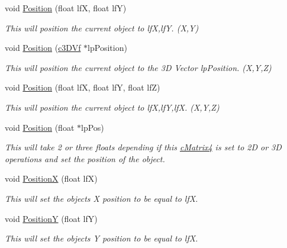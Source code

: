 \begin{DoxyCompactItemize}
void \hyperlink{classc_matrix4_a81cd364d37dc5eae6f968551331ad7a3}{Position} (float lfX, float lfY)
\begin{DoxyCompactList}\small\item\em This will position the current object to lfX,lfY. (X,Y) \item\end{DoxyCompactList}\item 
void \hyperlink{classc_matrix4_a8a49976693c27e4fbb5fce427eb6bcf5}{Position} (\hyperlink{classc3_d_vf}{c3DVf} $\ast$lpPosition)
\begin{DoxyCompactList}\small\item\em This will position the current object to the 3D Vector lpPosition. (X,Y,Z) \item\end{DoxyCompactList}\item 
void \hyperlink{classc_matrix4_ae404d9b94cb676d9896385fef1eda422}{Position} (float lfX, float lfY, float lfZ)
\begin{DoxyCompactList}\small\item\em This will position the current object to lfX,lfY,lfX. (X,Y,Z) \item\end{DoxyCompactList}\item 
void \hyperlink{classc_matrix4_ae3bb670db30cee45d59aef1599289086}{Position} (float $\ast$lpPos)
\begin{DoxyCompactList}\small\item\em This will take 2 or three floats depending if this \hyperlink{classc_matrix4}{cMatrix4} is set to 2D or 3D operations and set the position of the object. \item\end{DoxyCompactList}\item 
void \hyperlink{classc_matrix4_adf27db7265e42ccbbb5a6779800c39ea}{PositionX} (float lfX)
\begin{DoxyCompactList}\small\item\em This will set the objects X position to be equal to lfX. \item\end{DoxyCompactList}\item 
void \hyperlink{classc_matrix4_a4f7469486d7557e158ebc70a261c853c}{PositionY} (float lfY)
\begin{DoxyCompactList}\small\item\em This will set the objects Y position to be equal to lfX. \item\end{DoxyCompactList}\item 

\end{DoxyCompactItemize}
